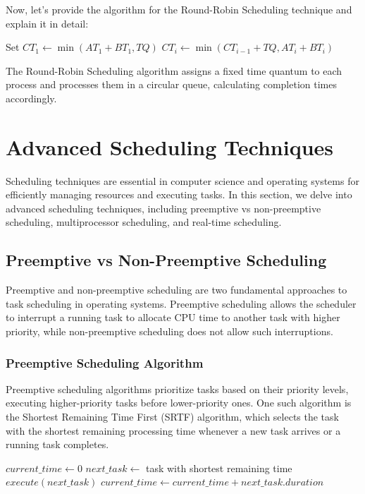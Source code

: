 \documentclass[12pt]{book} %
\begin{document}
Now, let's provide the algorithm for the Round-Robin Scheduling technique and explain it in detail:
\FloatBarrier
\begin{algorithm}[H]
\caption{Round-Robin Scheduling}
\begin{algorithmic}[1]
\State Set $CT_1 \gets \min(AT_1 + BT_1, TQ)$
    \State $CT_i \gets \min(CT_{i-1} + TQ, AT_i + BT_i)$
\EndFor
\end{algorithmic}
\end{algorithm}
\FloatBarrier
The Round-Robin Scheduling algorithm assigns a fixed time quantum to each process and processes them in a circular queue, calculating completion times accordingly.


\section{Advanced Scheduling Techniques}

Scheduling techniques are essential in computer science and operating systems for efficiently managing resources and executing tasks. In this section, we delve into advanced scheduling techniques, including preemptive vs non-preemptive scheduling, multiprocessor scheduling, and real-time scheduling.

\subsection{Preemptive vs Non-Preemptive Scheduling}

Preemptive and non-preemptive scheduling are two fundamental approaches to task scheduling in operating systems. Preemptive scheduling allows the scheduler to interrupt a running task to allocate CPU time to another task with higher priority, while non-preemptive scheduling does not allow such interruptions.

\subsubsection{Preemptive Scheduling Algorithm}

Preemptive scheduling algorithms prioritize tasks based on their priority levels, executing higher-priority tasks before lower-priority ones. One such algorithm is the Shortest Remaining Time First (SRTF) algorithm, which selects the task with the shortest remaining processing time whenever a new task arrives or a running task completes.
\FloatBarrier
\begin{algorithm}
\caption{Shortest Remaining Time First (SRTF)}
\begin{algorithmic}[1]
\State $current\_time \gets 0$
\State $next\_task \gets$ task with shortest remaining time
\State $execute(next\_task)$
\State $current\_time \gets current\_time + next\_task.duration$
\EndWhile
\EndProcedure
\end{algorithmic}
\end{algorithm}
\FloatBarrier
\end{document}
